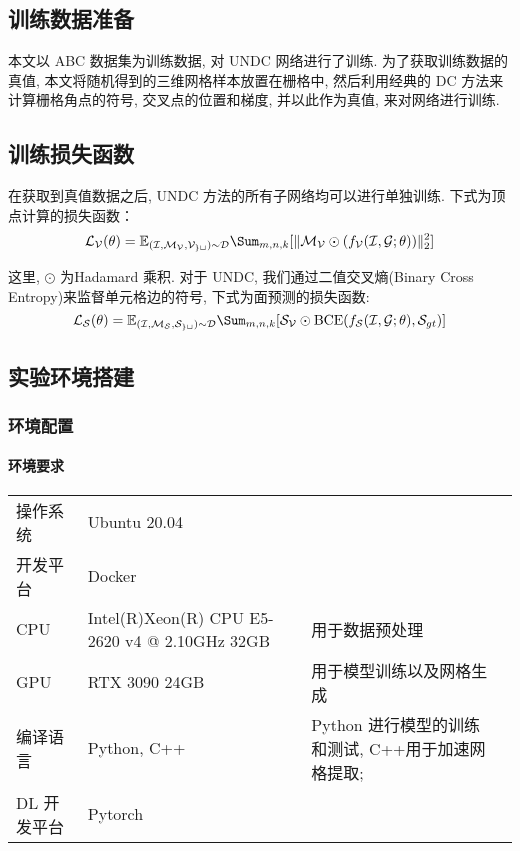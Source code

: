 \subsection{训练数据准备}
本文以 ABC 数据集为训练数据, 对 UNDC 网络进行了训练. 为了获取训练数据的真值, 本文将随机得到的三维网格样本放置在栅格中, 然后利用经典的 DC 方法来计算栅格角点的符号, 交叉点的位置和梯度, 并以此作为真值, 来对网络进行训练. 
\subsection{训练损失函数}
在获取到真值数据之后, UNDC 方法的所有子网络均可以进行单独训练. 下式为顶点计算的损失函数：
\begin{equation}
\mathcal{L_V}(\theta)=\mathbb{E}_{(\mathcal{I, M_V, V_{gt}})\sim \mathcal{D}}\Sum_{m,n,k}[\Vert \mathcal{M_V} \odot (f_\mathcal{V}(\mathcal{I,G};\theta)) \Vert ^2_2]
\end{equation}

这里, $\odot$ 为Hadamard 乘积. 对于 UNDC, 我们通过二值交叉熵(Binary Cross Entropy)来监督单元格边的符号, 下式为面预测的损失函数:
\begin{equation}
	\mathcal{L_S}(\theta)=\mathbb{E}_{(\mathcal{I, M_S, S_{gt}})\sim \mathcal{D}}\Sum_{m,n,k}[\mathcal{S_V} \odot \mathrm{BCE}(f_\mathcal{S}(\mathcal{I,G};\theta), \mathcal{S}_{gt})]
\end{equation}

\subsection{实验环境搭建}
\subsubsection{环境配置}
\paragraph{环境要求}
\begin{table}[h]
    \centering
    \begin{tabularx}{\textwidth}{X X X X}
		操作系统 & Ubuntu 20.04 & \\
		开发平台 & Docker & \\
		CPU & Intel(R)Xeon(R) CPU E5-2620 v4 @ 2.10GHz 32GB & 用于数据预处理 \\
		GPU & RTX 3090 24GB & 用于模型训练以及网格生成 \\
		编译语言 & Python, C++ & Python 进行模型的训练和测试, C++用于加速网格提取; \\
		DL 开发平台 & Pytorch & \\
    \end{tabularx}
\end{table}


